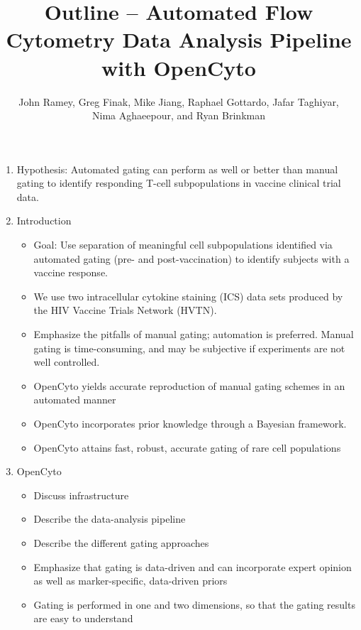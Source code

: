 \documentclass[12pt]{article}
\begin{document}
\title{Outline -- Automated Flow Cytometry Data Analysis Pipeline with OpenCyto}
\author{John Ramey, Greg Finak, Mike Jiang, Raphael Gottardo, Jafar Taghiyar,\\ Nima Aghaeepour, and Ryan Brinkman}

\maketitle

\doublespacing

\begin{enumerate}
	\item Hypothesis: Automated gating can perform as well or better than manual gating to identify responding T-cell
subpopulations in vaccine clinical trial data.
	\item Introduction
		\begin{itemize}
			\item Goal: Use separation of meaningful cell subpopulations identified via automated gating (pre- and post-vaccination) to identify subjects with a vaccine response.
			\item We use two intracellular cytokine staining (ICS) data sets produced by the HIV Vaccine Trials Network (HVTN).
			\item Emphasize the pitfalls of manual gating; automation is preferred. Manual gating is time-consuming, and may be subjective if experiments are not well controlled.
			\item OpenCyto yields accurate reproduction of manual gating schemes in an automated manner
			\item OpenCyto incorporates prior knowledge through a Bayesian framework.
			\item OpenCyto attains fast, robust, accurate gating of rare cell populations
		\end{itemize}
	\item OpenCyto
	\begin{itemize}
		\item Discuss infrastructure 
		\item Describe the data-analysis pipeline
		\item Describe the different gating approaches
		\item Emphasize that gating is data-driven and can incorporate expert opinion as well as marker-specific, data-driven priors
		\item Gating is performed in one and two dimensions, so that the gating results are easy to understand

\end{itemize}
\end{enumerate}
\end{document}
